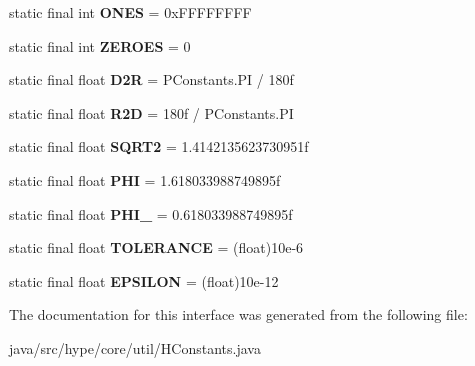 \begin{DoxyCompactItemize}
\item 
\hypertarget{interfacehype_1_1core_1_1util_1_1_h_constants_ad08e46794b996211ee5f65ab03acf324}{static final int {\bfseries O\-N\-E\-S} = 0x\-F\-F\-F\-F\-F\-F\-F\-F}\label{interfacehype_1_1core_1_1util_1_1_h_constants_ad08e46794b996211ee5f65ab03acf324}

\item 
\hypertarget{interfacehype_1_1core_1_1util_1_1_h_constants_a8a78fc9d19353efdcc19bf1cdecf8378}{static final int {\bfseries Z\-E\-R\-O\-E\-S} = 0}\label{interfacehype_1_1core_1_1util_1_1_h_constants_a8a78fc9d19353efdcc19bf1cdecf8378}

\item 
\hypertarget{interfacehype_1_1core_1_1util_1_1_h_constants_ad531c69eab62b467053e0ea54ed8d28c}{static final float {\bfseries D2\-R} = P\-Constants.\-P\-I / 180f}\label{interfacehype_1_1core_1_1util_1_1_h_constants_ad531c69eab62b467053e0ea54ed8d28c}

\item 
\hypertarget{interfacehype_1_1core_1_1util_1_1_h_constants_a00136241c26d0d042b11318116c74b93}{static final float {\bfseries R2\-D} = 180f / P\-Constants.\-P\-I}\label{interfacehype_1_1core_1_1util_1_1_h_constants_a00136241c26d0d042b11318116c74b93}

\item 
\hypertarget{interfacehype_1_1core_1_1util_1_1_h_constants_a39c184dac11cef9f4b1ddc54f052e612}{static final float {\bfseries S\-Q\-R\-T2} = 1.\-4142135623730951f}\label{interfacehype_1_1core_1_1util_1_1_h_constants_a39c184dac11cef9f4b1ddc54f052e612}

\item 
\hypertarget{interfacehype_1_1core_1_1util_1_1_h_constants_ae05e0f9228654eda8d3fcb6e5b010fd9}{static final float {\bfseries P\-H\-I} = 1.\-618033988749895f}\label{interfacehype_1_1core_1_1util_1_1_h_constants_ae05e0f9228654eda8d3fcb6e5b010fd9}

\item 
\hypertarget{interfacehype_1_1core_1_1util_1_1_h_constants_a38004c29ec77f13033b3a5993a7d4818}{static final float {\bfseries P\-H\-I\-\_} = 0.\-618033988749895f}\label{interfacehype_1_1core_1_1util_1_1_h_constants_a38004c29ec77f13033b3a5993a7d4818}

\item 
\hypertarget{interfacehype_1_1core_1_1util_1_1_h_constants_ac385cb8b9b7903b151f1c4c94e66fa44}{static final float {\bfseries T\-O\-L\-E\-R\-A\-N\-C\-E} = (float)10e-\/6}\label{interfacehype_1_1core_1_1util_1_1_h_constants_ac385cb8b9b7903b151f1c4c94e66fa44}

\item 
\hypertarget{interfacehype_1_1core_1_1util_1_1_h_constants_af58dd23b7edb42a36cd6cae38a7174bf}{static final float {\bfseries E\-P\-S\-I\-L\-O\-N} = (float)10e-\/12}\label{interfacehype_1_1core_1_1util_1_1_h_constants_af58dd23b7edb42a36cd6cae38a7174bf}

\end{DoxyCompactItemize}


The documentation for this interface was generated from the following file\-:\begin{DoxyCompactItemize}
\item 
java/src/hype/core/util/H\-Constants.\-java\end{DoxyCompactItemize}
